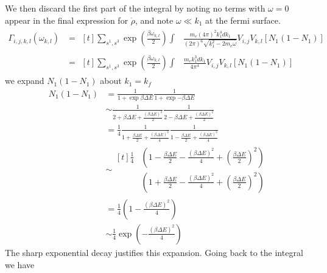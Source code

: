 We then discard the first part of the integral by noting no
terms with \(\omega = 0\) appear in the
final expression for \(\dot{\rho}\), and note
\(\omega \ll k_1\) at the fermi surface.
\begin{align}
    \Gamma_{i,j, k,l}(\omega_{k,l}) & =\begin{aligned}[t]
        \sum_{s^1,s^3} \exp{(\frac{\beta \omega_{k,l}}{2})} \int &
        \frac{m_e{(4\pi)}^2 k_1^4 dk_1}{{(2\pi)}^6\sqrt{k_1^2 - 2m_e\omega}}
        V_{i,j} V_{k,l} [ N_1 (1 - N_1)]
    \end{aligned} \\
                                    & =\begin{aligned}[t]
        \sum_{s^1,s^3} \exp{(\frac{\beta \omega_{k,l}}{2})} \int &
        \frac{m_e k_1^3 dk_1}{4\pi^4}
        V_{i,j} V_{k,l} [ N_1 (1 - N_1)]
    \end{aligned}
\end{align}
we expand \(N_1 (1 - N_1)\) about \(k_1 = k_f\)
\begin{align}
    N_1 (1 - N_1) & = \frac{1}{1 + \exp{\beta \Delta E}}
    \frac{1}{1 + \exp{-\beta \Delta E}}                                                \\
                  & \sim \frac{1}{2 + \beta \Delta E + \frac{{(\beta \Delta E)}^2}{2}}
    \frac{1}{2 - \beta \Delta E + \frac{{(\beta \Delta E)}^2}{2}}                      \\
                  & = \frac{1}{4}
    \frac{1}{1 + \frac{\beta \Delta E}{2} + \frac{{(\beta \Delta E)}^2}{4}}
    \frac{1}{1 - \frac{\beta \Delta E}{2} + \frac{{(\beta \Delta E)}^2}{4}}            \\
                  & \sim \begin{aligned}[t]
        \frac{1}{4}
         & (1 - \frac{\beta \Delta E}{2} - \frac{{(\beta \Delta E)}^2}{4} + {(\frac{\beta \Delta E}{2})}^2) \\
         & (1 + \frac{\beta \Delta E}{2} - \frac{{(\beta \Delta E)}^2}{4} + {(\frac{\beta \Delta E}{2})}^2)
    \end{aligned}                                    \\
                  & = \frac{1}{4}(1 - \frac{{(\beta \Delta E)}^2}{4})                  \\
                  & \sim \frac{1}{4}\exp{(- \frac{{(\beta \Delta E)}^2}{4})}
\end{align}
The sharp exponential decay justifies
this expansion. Going back to the
integral we have
